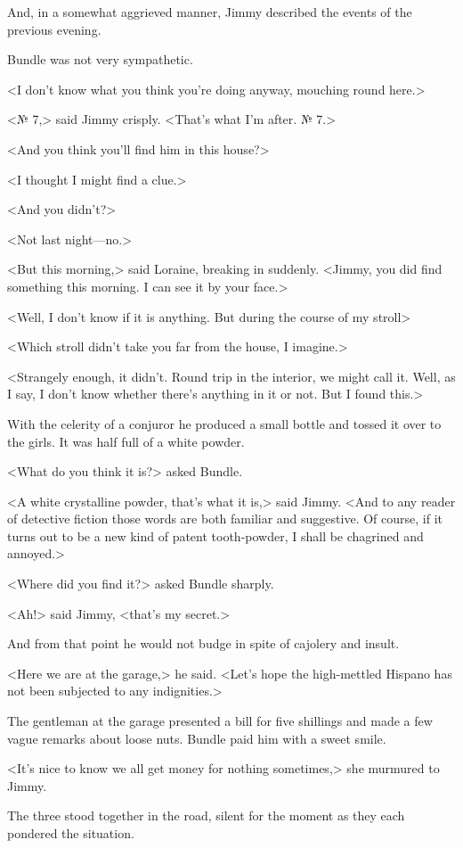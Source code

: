 And, in a somewhat aggrieved manner, Jimmy described the events of the previous evening.

Bundle was not very sympathetic.

<I don't know what you think you're doing anyway, mouching round here.>

<№ 7,> said Jimmy crisply. <That's what I'm after. № 7.>

<And you think you'll find him in this house?>

<I thought I might find a clue.>

<And you didn't?>

<Not last night—no.>

<But this morning,> said Loraine, breaking in suddenly. <Jimmy, you did find something this morning. I can see it by your face.>

<Well, I don't know if it is anything. But during the course of my stroll\longdash>

<Which stroll didn't take you far from the house, I imagine.>

<Strangely enough, it didn't. Round trip in the interior, we might call it. Well, as I say, I don't know whether there's anything in it or not. But I found this.>

With the celerity of a conjuror he produced a small bottle and tossed it over to the girls. It was half full of a white powder.

<What do you think it is?> asked Bundle.

<A white crystalline powder, that's what it is,> said Jimmy. <And to any reader of detective fiction those words are both familiar and suggestive. Of course, if it turns out to be a new kind of patent tooth-powder, I shall be chagrined and annoyed.>

<Where did you find it?> asked Bundle sharply.

<Ah!> said Jimmy, <that's my secret.>

And from that point he would not budge in spite of cajolery and insult.

<Here we are at the garage,> he said. <Let's hope the high-mettled Hispano has not been subjected to any indignities.>

The gentleman at the garage presented a bill for five shillings and made a few vague remarks about loose nuts. Bundle paid him with a sweet smile.

<It's nice to know we all get money for nothing sometimes,> she murmured to Jimmy.

The three stood together in the road, silent for the moment as they each pondered the situation.

